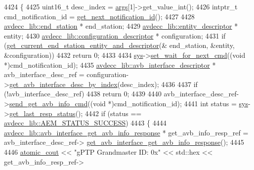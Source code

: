 \begin{DoxyCode}
4424 \{
4425     uint16\_t desc\_index = \hyperlink{namespaceastime__fitline_a8187411843a6284ffb964ef3fb9fcab3}{args}[1]->get\_value\_int();
4426     intptr\_t cmd\_notification\_id = \hyperlink{classcmd__line_a57486218387d1aa9d262eb7c176154ad}{get\_next\_notification\_id}();
4427 
4428     \hyperlink{classavdecc__lib_1_1end__station}{avdecc\_lib::end\_station} * end\_station;
4429     \hyperlink{classavdecc__lib_1_1entity__descriptor}{avdecc\_lib::entity\_descriptor} * entity;
4430     \hyperlink{classavdecc__lib_1_1configuration__descriptor}{avdecc\_lib::configuration\_descriptor} * configuration;
4431     \textcolor{keywordflow}{if} (\hyperlink{classcmd__line_ac2d4611fba7db03d436a2e3c1e64828e}{get\_current\_end\_station\_entity\_and\_descriptor}(&
      end\_station, &entity, &configuration))
4432         \textcolor{keywordflow}{return} 0;
4433 
4434     \hyperlink{classcmd__line_a485db4800e331cb4052c447fdf5d154e}{sys}->\hyperlink{classavdecc__lib_1_1system_a26b769584f10225077da47583edda33e}{set\_wait\_for\_next\_cmd}((\textcolor{keywordtype}{void} *)cmd\_notification\_id);
4435     \hyperlink{classavdecc__lib_1_1avb__interface__descriptor}{avdecc\_lib::avb\_interface\_descriptor} * avb\_interface\_desc\_ref = 
      configuration->\hyperlink{classavdecc__lib_1_1configuration__descriptor_a177c390ccb74a31750b8eb0feb406144}{get\_avb\_interface\_desc\_by\_index}(desc\_index);
4436 
4437     \textcolor{keywordflow}{if} (!avb\_interface\_desc\_ref)
4438         \textcolor{keywordflow}{return} 0;
4439 
4440     avb\_interface\_desc\_ref->\hyperlink{classavdecc__lib_1_1avb__interface__descriptor_a6b3bad3383131bc365a39a16217c22d9}{send\_get\_avb\_info\_cmd}((\textcolor{keywordtype}{void} *)cmd\_notification\_id);
4441     \textcolor{keywordtype}{int} status = \hyperlink{classcmd__line_a485db4800e331cb4052c447fdf5d154e}{sys}->\hyperlink{classavdecc__lib_1_1system_aa63e8d1a4e51f695cdcccc9340922407}{get\_last\_resp\_status}();
4442     \textcolor{keywordflow}{if} (status == \hyperlink{namespaceavdecc__lib_affd436edb2cecd20cfd784a84f852b2bac947077909cb590b84f4b5db413080e0}{avdecc\_lib::AEM\_STATUS\_SUCCESS})
4443     \{
4444         \hyperlink{classavdecc__lib_1_1avb__interface__get__avb__info__response}{avdecc\_lib::avb\_interface\_get\_avb\_info\_response} * 
      get\_avb\_info\_resp\_ref = avb\_interface\_desc\_ref->
      \hyperlink{classavdecc__lib_1_1avb__interface__descriptor_a91a9e0d9acb817071caa8e0f499e2cda}{get\_avb\_interface\_get\_avb\_info\_response}();
4445 
4446         \hyperlink{cmd__line_8h_a0bc38ccc65c79ba06c6fcd7b4bf554c3}{atomic\_cout} << \textcolor{stringliteral}{"gPTP Grandmaster ID: 0x"} << std::hex << get\_avb\_info\_resp\_ref->

\end{DoxyCode}
